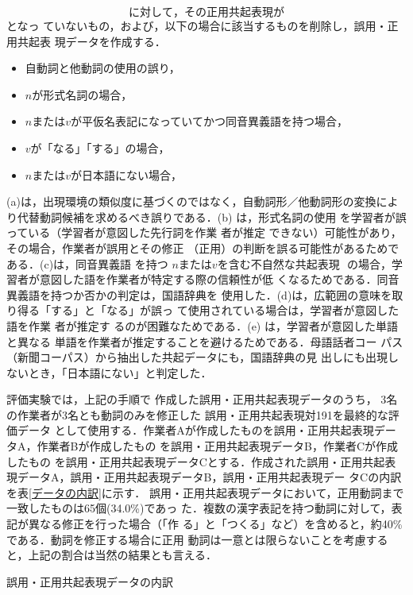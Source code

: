 \documentclass[japanese]{jnlp_1.4}
\newcommand{\tupple}[1]{}
\begin{document}
\begin{itemize}
$\tupple{n,c,v}$ に対して，その正用共起表現が $\tupple{n,c,v^*}$ となっ
ていないもの，および，以下の場合に該当するものを削除し，誤用・正用共起表
現データを作成する．
\begin{itemize}
\item[(a)] 自動詞と他動詞の使用の誤り，
\item[(b)] $n$が形式名詞の場合，
\item[(c)] $n$または$v$が平仮名表記になっていてかつ同音異義語を持つ場合，
\item[(d)] $v$が「なる」「する」の場合，
\item[(e)] $n$または$v$が日本語にない場合，
\end{itemize}
(a)は，出現環境の類似度に基づくのではなく，自動詞形／他動詞形の変換によ
	   り代替動詞候補を求めるべき誤りである．(b) は，形式名詞の使用
	   を学習者が誤っている（学習者が意図した先行詞を作業
	   者が推定
	   できない）可能性があり，その場合，作業者が誤用とその修正
	   （正用）の判断を誤る可能性があるためである．(c)は，同音異義語
	   を持つ $n$または$v$を含む不自然な共起表現 $\tupple{n, c, v}$ 
	   の場合，学習者が意図した語を作業者が特定する際の信頼性が低
	   くなるためである．同音異義語を持つか否かの判定は，国語辞典を
	   使用した．(d)は，広範囲の意味を取り得る「する」と「なる」が誤っ
	   て使用されている場合は，学習者が意図した語を作業
	   者が推定す
	   るのが困難なためである．(e) は，学習者が意図した単語と異なる
	   単語を作業者が推定することを避けるためである．母語話者コー
	   パス（新聞コーパス）から抽出した共起データにも，国語辞典の見
	   出しにも出現しないとき，「日本語にない」と判定した．
\end{itemize}

評価実験では，上記の手順で
	   作成した誤用・正用共起表現データのうち，
	   3名の作業者が3名とも動詞のみを修正した
誤用・正用共起表現対191を最終的な評価データ
	   として使用する．作業者Aが作成したものを誤用・正用共起表現データA，作業者Bが作成したもの
	   を誤用・正用共起表現データB，作業者Cが作成したもの
	   を誤用・正用共起表現データCとする．作成された誤用・正用共起表
	   現データA，誤用・正用共起表現データB，誤用・正用共起表現デー
	   タCの内訳を表\ref{データの内訳}に示す．
誤用・正用共起表現データにおいて，正用動詞まで一致したものは65個(34.0\%)であっ
た．複数の漢字表記を持つ動詞に対して，表記が異なる修正を行った場合（「作
る」と「つくる」など）を含めると，約40\%である．動詞を修正する場合に正用
動詞は一意とは限らないことを考慮すると，上記の割合は当然の結果とも言える．

\begin{table}[t]
\caption{誤用・正用共起表現データの内訳}
\label{データの内訳}

\end{table}
\end{document}
